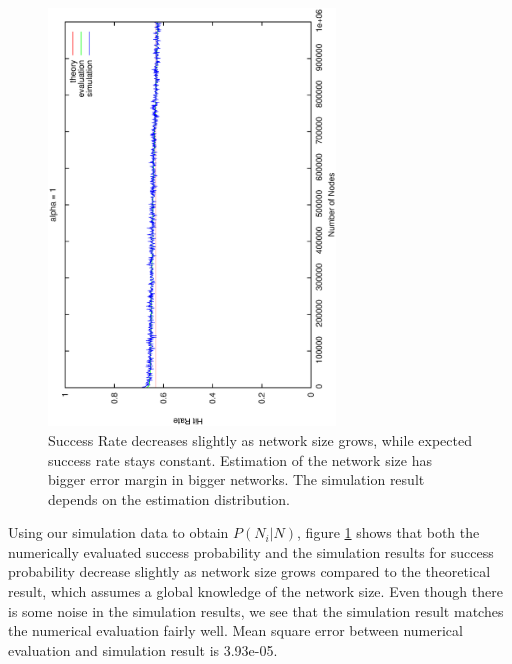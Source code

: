 \documentclass[conference]{IEEEtran}
\begin{document}
\begin{figure}
\centering
\includegraphics[angle=270,width=3in]{evaluation}
\caption{Success Rate decreases slightly as network size grows, 
while expected success rate stays constant. 
Estimation of the network size has bigger error margin in bigger 
networks. The simulation result depends on the estimation distribution.} 
\label{fig:anal}
\end{figure}
Using our simulation data to obtain $P(N_i|N)$,
figure \ref{fig:anal} shows that both the numerically evaluated success probability
and the simulation results for success probability decrease slightly 
as network size grows compared to the theoretical result, which assumes a global
knowledge of the network size. Even though there is some noise in the 
simulation results, we see that
the simulation result matches the numerical evaluation fairly well. Mean square error between numerical evaluation and 
simulation result is 3.93e-05.
\fi
\end{document}
